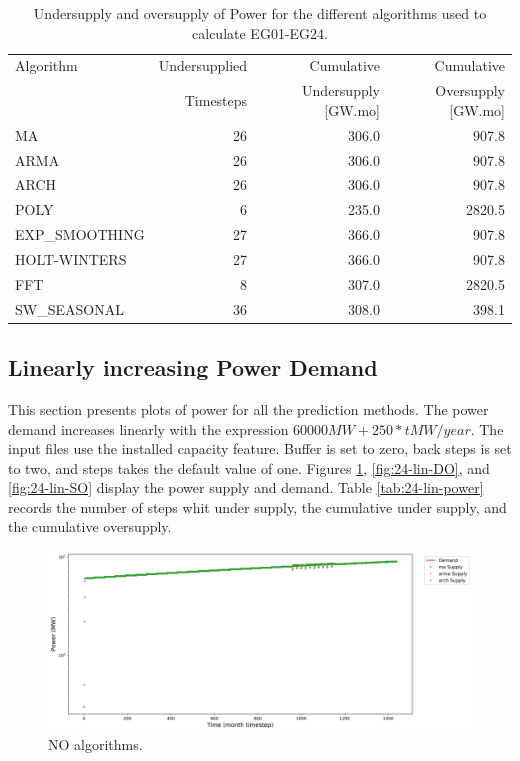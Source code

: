 \documentclass[11pt]{article}
\begin{document}
\begin{table}[H]
	\centering
	\caption{Undersupply and oversupply of Power for the different algorithms used to calculate EG01-EG24.}
	\label{tab:24-power}
	\begin{tabularx}{\textwidth}{lRRR}
		\hline
		Algorithm & Undersupplied & Cumulative  & Cumulative \\
		& Timesteps     & Undersupply [GW.mo]  & Oversupply [GW.mo] \\ \hline
		MA        & 26 	& 306.0 &  907.8   \\ 
		ARMA      & 26 	& 306.0 &  907.8   \\ 
		ARCH      & 26 	& 306.0 &  907.8   \\ 
		POLY      &  6 	& 235.0 &  2820.5  \\ 
		EXP\_SMOOTHING 	& 27 & 366.0 & 907.8 \\ 
		HOLT-WINTERS  	& 27 & 366.0 & 907.8 \\ 
		FFT       & 8	& 307.0	& 2820.5 \\ 
		SW\_SEASONAL    & 36 & 308.0 & 398.1	\\ \hline
	\end{tabularx}
\end{table}

\subsection{Linearly increasing Power Demand}

This section presents plots of power for all the prediction methods. The power demand increases linearly with the expression $60000 MW + 250*t MW/year$. The input files use the installed capacity feature. Buffer is set to zero, back steps is set to two, and steps takes the default value of one.
Figures \ref{fig:24-lin-NO}, \ref{fig:24-lin-DO}, and \ref{fig:24-lin-SO} display the power supply and demand.
Table \ref{tab:24-lin-power} records the number of steps whit under supply, the cumulative under supply, and the cumulative oversupply.

\begin{figure}[H]
	\centering
	\includegraphics[width=\textwidth]{24-figures/lin-24-power-buffer01.png} 
	\hfill
	\caption{NO algorithms.}
	\label{fig:24-lin-NO}
\end{figure}
\end{document}
